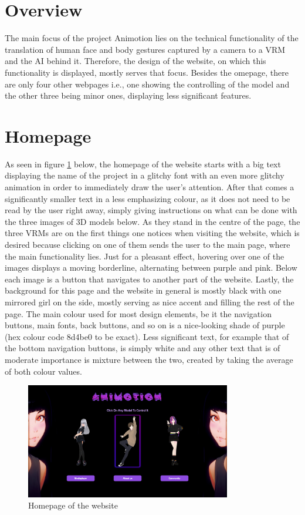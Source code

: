 \section{Overview}
The main focus of the project Animotion lies on the technical functionality 
of the translation of human face and body gestures captured by a camera to 
a VRM and the AI behind it. Therefore, the design of the website, on which
this functionality is displayed, mostly serves that focus. Besides the 
omepage, there are only four other webpages i.e., one showing the controlling 
of the model and the other three being minor ones, displaying less significant 
features.

\section{Homepage}
As seen in figure \ref{fig:homepage} below, the homepage of the website starts with a big text
displaying the name of the project in a glitchy font with an even more glitchy
animation in order to immediately draw the user's attention. After that comes a
significantly smaller text in a less emphasizing colour, as it does not need to
be read by the user right away, simply giving instructions on what can be done
with the three images of 3D models below. As they stand in the centre of the page,
the three VRMs are on the first things one notices when visiting the website, which
is desired because clicking on one of them sends the user to the main page, where
the main functionality lies. Just for a pleasant effect, hovering over one of the
images displays a moving borderline, alternating between purple and pink. Below
each image is a button that navigates to another part of the website. Lastly, the
background for this page and the website in general is mostly black with one mirrored
girl on the side, mostly serving as nice accent and filling the rest of the page.
The main colour used for most design elements, be it the navigation buttons, main
fonts, back buttons, and so on is a nice-looking shade of purple (hex colour code 8d4be0 to be exact). 
Less significant text, for example that of the bottom navigation
buttons, is simply white and any other text that is of moderate importance is mixture
between the two, created by taking the average of both colour values.
\\
\begin{figure}[htb]
    \centering
    \includegraphics[width=0.8\textwidth]{pics/Animotion_homepage.png}
    \caption{Homepage of the website}
    \label{fig:homepage}
\end{figure}
\\
